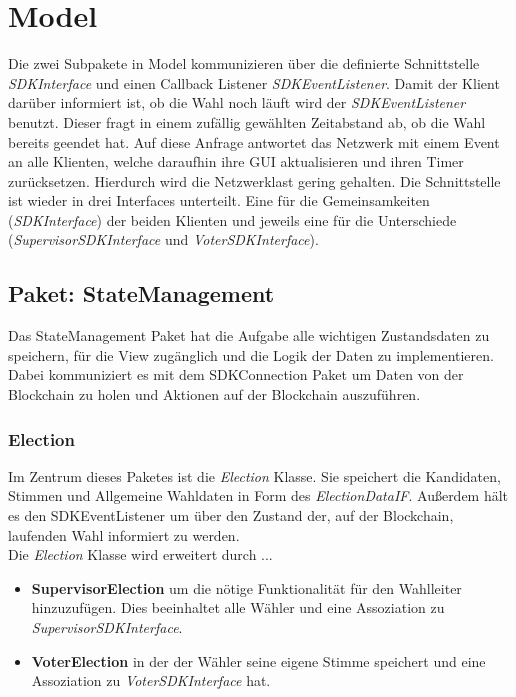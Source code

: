 \documentclass[parskip=full]{scrartcl}
\newcommand{\textitx}[1]{\mbox{\textit{#1}}}
\newcommand{\fakeparagraph}[1]{\textbf{#1}}
\begin{document}
	\newpage
	\section{Model}
	\pagestyle{plain}
	Die zwei Subpakete in Model kommunizieren über die definierte Schnittstelle \textitx{SDKInterface} und einen Callback Listener \textitx{SDKEventListener}. 
	Damit der Klient darüber informiert ist, ob die Wahl noch läuft wird der \textitx{SDKEventListener} benutzt. Dieser fragt in einem zufällig gewählten Zeitabstand ab, ob die Wahl bereits geendet hat. Auf diese Anfrage antwortet das Netzwerk mit einem Event an alle Klienten, welche daraufhin ihre GUI aktualisieren und ihren Timer zurücksetzen. Hierdurch wird die Netzwerklast gering gehalten.
	Die Schnittstelle ist wieder in drei Interfaces unterteilt. Eine für die Gemeinsamkeiten (\textitx{SDKInterface}) der beiden Klienten und jeweils eine für die Unterschiede (\textitx{SupervisorSDKInterface} und \textitx{VoterSDKInterface}).

	\subsection{Paket: StateManagement}
	Das StateManagement Paket hat die Aufgabe alle wichtigen Zustandsdaten zu speichern, für die View zugänglich und die Logik der Daten zu implementieren.
	Dabei kommuniziert es mit dem SDKConnection Paket um Daten von der Blockchain zu holen und Aktionen auf der Blockchain auszuführen.
	
		\subsubsection{Election}
		Im Zentrum dieses Paketes ist die \textitx{Election} Klasse. Sie speichert die Kandidaten, Stimmen und Allgemeine Wahldaten in Form des \textitx{ElectionDataIF}. Außerdem hält es den SDKEventListener um über den Zustand der, auf 
		der Blockchain, laufenden Wahl informiert zu werden.\\
		Die \textitx{Election} Klasse wird erweitert durch ...
		\begin{itemize}
			\item\fakeparagraph{SupervisorElection} um die nötige Funktionalität für den Wahlleiter hinzuzufügen. Dies beeinhaltet alle Wähler und eine Assoziation zu \textitx{SupervisorSDKInterface}.
			\item\fakeparagraph{VoterElection} in der der Wähler seine eigene Stimme speichert und eine Assoziation zu \textitx{VoterSDKInterface} hat.
		\end{itemize}
		
\end{document}
